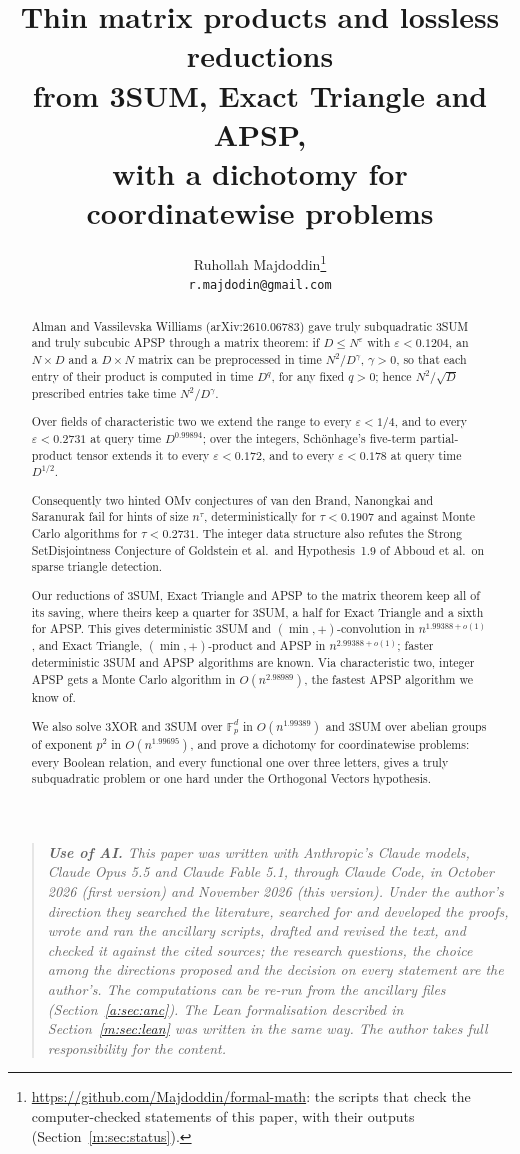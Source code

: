 \documentclass[11pt]{article}
\title{Thin matrix products and lossless reductions\texorpdfstring{\\}{ }from 3SUM, Exact Triangle and APSP,\texorpdfstring{\\}{ }with a dichotomy for coordinatewise problems}%
\author{Ruhollah Majdoddin\thanks{\url{https://github.com/Majdoddin/formal-math}: the scripts that check the computer-checked statements of this paper, with their outputs (Section~\ref{m:sec:status}).}\\ \normalsize\texttt{r.majdodin@gmail.com}}%
\date{}
\theoremstyle{definition}
\theoremstyle{remark}
\newcommand{\ExpThreeSumBest}{1.99388}%
\newcommand{\APSPmcOurs}{2.98989}%
\newcommand{\HintedOMvMcOurs}{0.2731}%
\newcommand{\ExpAPSPBest}{2.99388}%
\newcommand{\CharTwoQ}{0.99894}%
\newcommand{\ExpBestUp}{1.99389}%
\newcommand{\ExpHalfBestUp}{1.99695}%
\begin{document}
\maketitle

\begin{abstract}
Alman and Vassilevska Williams (arXiv:2610.06783) gave truly subquadratic 3SUM and truly subcubic APSP through a matrix theorem: if $D\le N^\varepsilon$ with $\varepsilon<0.1204$, an $N\times D$ and a $D\times N$ matrix can be preprocessed in time $N^2/D^\gamma$, $\gamma>0$, so that each entry of their product is computed in time $D^q$, for any fixed $q>0$; hence $N^2/\sqrt D$ prescribed entries take time $N^2/D^\gamma$.

Over fields of characteristic two we extend the range to every $\varepsilon<1/4$, and to every $\varepsilon<\HintedOMvMcOurs$ at query time $D^{\CharTwoQ}$; over the integers, Schönhage's five-term partial-product tensor extends it to every $\varepsilon<0.172$, and to every $\varepsilon<0.178$ at query time $D^{1/2}$.

Consequently two hinted OMv conjectures of van den Brand, Nanongkai and Saranurak fail for hints of size $n^\tau$, deterministically for $\tau<0.1907$ and against Monte Carlo algorithms for $\tau<\HintedOMvMcOurs$. The integer data structure also refutes the Strong SetDisjointness Conjecture of Goldstein et al.\ and Hypothesis~1.9 of Abboud et al.\ on sparse triangle detection.

Our reductions of 3SUM, Exact Triangle and APSP to the matrix theorem keep all of its saving, where theirs keep a quarter for 3SUM, a half for Exact Triangle and a sixth for APSP. This gives deterministic 3SUM and $(\min,+)$-convolution in $n^{\ExpThreeSumBest+o(1)}$, and Exact Triangle, $(\min,+)$-product and APSP in $n^{\ExpAPSPBest+o(1)}$; faster deterministic 3SUM and APSP algorithms are known. Via characteristic two, integer APSP gets a Monte Carlo algorithm in $O(n^{\APSPmcOurs})$, the fastest APSP algorithm we know of.

We also solve 3XOR and 3SUM over $\mathbb F_p^d$ in $O(n^{\ExpBestUp})$ and 3SUM over abelian groups of exponent $p^2$ in $O(n^{\ExpHalfBestUp})$, and prove a dichotomy for coordinatewise problems: every Boolean relation, and every functional one over three letters, gives a truly subquadratic problem or one hard under the Orthogonal Vectors hypothesis.
\end{abstract}
\begin{quote}\small\itshape
\textbf{Use of AI.} This paper was written with Anthropic's Claude models, Claude Opus 5.5 and Claude Fable 5.1, through Claude Code, in October 2026 (first version) and November 2026 (this version). Under the author's direction they searched the literature, searched for and developed the proofs, wrote and ran the ancillary scripts, drafted and revised the text, and checked it against the cited sources; the research questions, the choice among the directions proposed and the decision on every statement are the author's. The computations can be re-run from the ancillary files (Section~\ref{a:sec:anc}). The Lean formalisation described in Section~\ref{m:sec:lean} was written in the same way. The author takes full responsibility for the content.
\end{quote}
\end{document}
